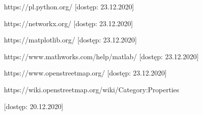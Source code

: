 \documentclass[a4paper, 12pt, twoside, openright]{article}
\begin{document}
\begin{thebibliography}{99}
	 https://pl.python.org/ [dostęp: 23.12.2020]
	
	 https://networkx.org/ [dostęp: 23.12.2020]
	
	 https://matplotlib.org/ [dostęp: 23.12.2020]

	 https://www.mathworks.com/help/matlab/ [dostęp: 23.12.2020]
	
	 https://www.openstreetmap.org/ [dostęp: 23.12.2020]
	
	
	 https://wiki.openstreetmap.org/wiki/Category:Properties 
	
	[dostęp: 20.12.2020]

\end{thebibliography}	
\end{document}

